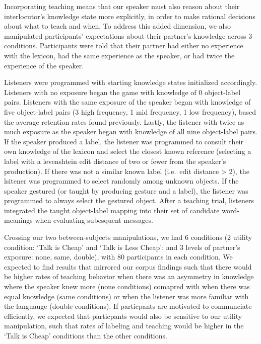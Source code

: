 \documentclass[10pt, letterpaper]{article}
\begin{document}
Incorporating teaching means that our speaker must also reason about
their interlocutor's knowledge state more explicitly, in order to make
rational decisions about what to teach and when. To address this added
dimension, we also manipulated participants' expectations about their
partner's knowledge across 3 conditions. Participants were told that
their partner had either no experience with the lexicon, had the same
experience as the speaker, or had twice the experience of the speaker.

Listeners were programmed with starting knowledge states initialized
accordingly. Listeners with no exposure began the game with knowledge of
0 object-label pairs. Listeners with the same exposure of the speaker
began with knowledge of five object-label pairs (3 high frequency, 1 mid
frequency, 1 low frequency), based the average retention rates found
previously. Lastly, the listener with twice as much exposure as the
speaker began with knowledge of all nine object-label pairs. If the
speaker produced a label, the listener was programmed to consult their
own knowledge of the lexicon and select the closest known reference
(selecting a label with a levenshtein edit distance of two or fewer from
the speaker's production). If there was not a similar known label
(i.e.~edit distance \textgreater{} 2), the lsitener was programmed to
select randomly among unknown objects. If the speaker gestured (or
taught by producing gesture and a label), the listener was programmed to
always select the gestured object. After a teaching trial, listeners
integrated the taught object-label mapping into their set of candidate
word-meanings when evaluating subesquent messages.

Crossing our two between-subjects manipulations, we had 6 conditions (2
utility condition: `Talk is Cheap' and `Talk is Less Cheap'; and 3
levels of partner's exposure: none, same, double), with 80 participants
in each condition. We expected to find results that mirrored our corpus
findings such that there would be higher rates of teaching behavior when
there was an asymmetry in knowledge where the speaker knew more (none
conditions) comapred with when there was equal knowledge (same
conditions) or when the listener was more familiar with the languauge
(double conditions). If particpants are motivated to communciate
efficiently, we expected that particpants would also be sensitive to our
utility manipulation, such that rates of labeling and teaching would be
higher in the `Talk is Cheap' conditions than the other conditions.
\end{document}
